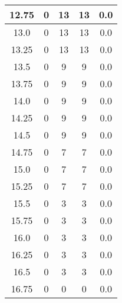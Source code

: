 \documentclass[letterpaper, 12pt]{article}
\begin{document}
\begin{longtable}{|c|c|c|c|c|}
\hline
12.75 & 0 & 13 & 13 & 0.0 \\
\hline
13.0 & 0 & 13 & 13 & 0.0 \\
\hline
13.25 & 0 & 13 & 13 & 0.0 \\
\hline
13.5 & 0 & 9 & 9 & 0.0 \\
\hline
13.75 & 0 & 9 & 9 & 0.0 \\
\hline
14.0 & 0 & 9 & 9 & 0.0 \\
\hline
14.25 & 0 & 9 & 9 & 0.0 \\
\hline
14.5 & 0 & 9 & 9 & 0.0 \\
\hline
14.75 & 0 & 7 & 7 & 0.0 \\
\hline
15.0 & 0 & 7 & 7 & 0.0 \\
\hline
15.25 & 0 & 7 & 7 & 0.0 \\
\hline
15.5 & 0 & 3 & 3 & 0.0 \\
\hline
15.75 & 0 & 3 & 3 & 0.0 \\
\hline
16.0 & 0 & 3 & 3 & 0.0 \\
\hline
16.25 & 0 & 3 & 3 & 0.0 \\
\hline
16.5 & 0 & 3 & 3 & 0.0 \\
\hline
16.75 & 0 & 0 & 0 & 0.0 \\
\hline
\end{longtable}
\end{document}
